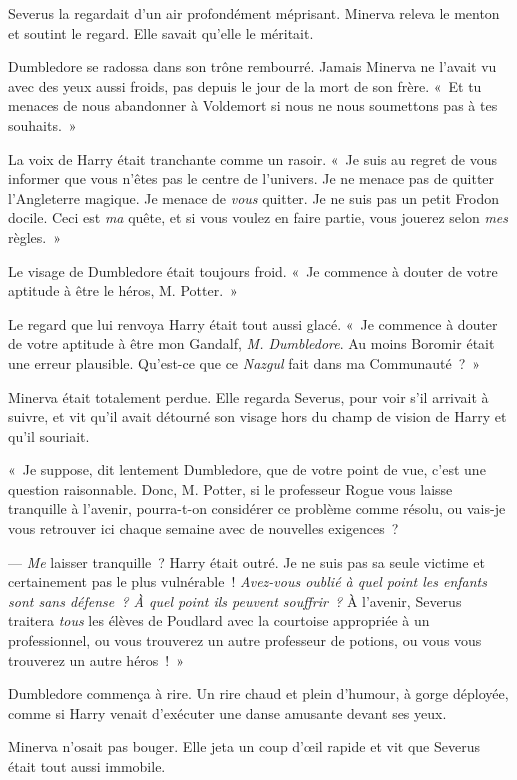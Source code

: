 Severus la regardait d'un air profondément méprisant.
Minerva releva le menton et soutint le regard.
Elle savait qu'elle le méritait.

Dumbledore se radossa dans son trône rembourré.
Jamais Minerva ne l'avait vu avec des yeux aussi froids, pas depuis le jour de la mort de son frère.
«~Et tu menaces de nous abandonner à Voldemort si nous ne nous soumettons pas à tes souhaits.~»

La voix de Harry était tranchante comme un rasoir.
«~Je suis au regret de vous informer que vous n'êtes pas le centre de l'univers.
Je ne menace pas de quitter l'Angleterre magique.
Je menace de \emph{vous} quitter.
Je ne suis pas un petit Frodon docile.
Ceci est \emph{ma} quête, et si vous voulez en faire partie, vous jouerez selon \emph{mes} règles.~»

Le visage de Dumbledore était toujours froid.
«~Je commence à douter de votre aptitude à être le héros, M. Potter.~»

Le regard que lui renvoya Harry était tout aussi glacé.
«~Je commence à douter de votre aptitude à être mon Gandalf, \emph{M. Dumbledore}.
Au moins Boromir était une erreur plausible.
Qu'est-ce que ce \emph{Nazgul} fait dans ma Communauté~?~»

Minerva était totalement perdue.
Elle regarda Severus, pour voir s'il arrivait à suivre, et vit qu'il avait détourné son visage hors du champ de vision de Harry et qu'il souriait.

«~Je suppose, dit lentement Dumbledore, que de votre point de vue, c'est une question raisonnable.
Donc, M. Potter, si le professeur Rogue vous laisse tranquille à l'avenir, pourra-t-on considérer ce problème comme résolu, ou vais-je vous retrouver ici chaque semaine avec de nouvelles exigences~?

--- \emph{Me} laisser tranquille~? Harry était outré.
Je ne suis pas sa seule victime et certainement pas le plus vulnérable~!
\emph{Avez-vous oublié à quel point les enfants sont sans défense~?
À quel point ils peuvent souffrir~?}
À l'avenir, Severus traitera \emph{tous} les élèves de Poudlard avec la courtoise appropriée à un professionnel, ou vous trouverez un autre professeur de potions, ou vous vous trouverez un autre héros~!~»

Dumbledore commença à rire.
Un rire chaud et plein d'humour, à gorge déployée, comme si Harry venait d'exécuter une danse amusante devant ses yeux.

Minerva n'osait pas bouger.
Elle jeta un coup d'œil rapide et vit que Severus était tout aussi immobile.

